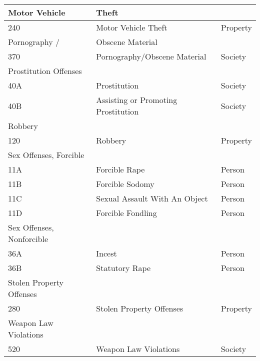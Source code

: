 \begin{longtable}{|m{8em} m{16em} m{7em}|}
    Motor Vehicle & Theft & \\
    \hline
    240 &
    Motor Vehicle Theft &
    Property\\
    \hline

    Pornography / & Obscene Material & \\
    \hline
    370 &
    Pornography/Obscene Material &
    Society\\
    \hline

    Prostitution Offenses & & \\
    \hline
    40A &
    Prostitution &
    Society\\
    \hline
    40B &
    Assisting or Promoting Prostitution &
    Society\\
    \hline

    Robbery & & \\
    \hline
    120 &
    Robbery &
    Property\\
    \hline

    Sex Offenses, Forcible & & \\
    \hline
    11A &
    Forcible Rape &
    Person\\
    \hline
    11B &
    Forcible Sodomy &
    Person\\
    \hline
    11C &
    Sexual Assault With An Object &
    Person\\
    \hline
    11D &
    Forcible Fondling &
    Person\\
    \hline

    Sex Offenses, Nonforcible & & \\
    \hline
    36A &
    Incest &
    Person\\
    \hline
    36B &
    Statutory Rape &
    Person\\
    \hline

    Stolen Property Offenses & & \\
    \hline
    280 &
    Stolen Property Offenses &
    Property\\
    \hline

    Weapon Law Violations & & \\
    \hline
    520 &
    Weapon Law Violations &
    Society\\
    \hline

\end{longtable}

